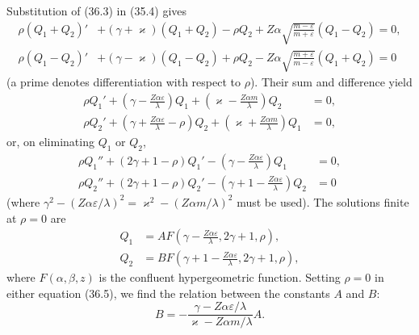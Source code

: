 Substitution of (36.3) in (35.4) gives
\[
\begin{aligned}
\rho(Q_1+Q_2)'&+(\gamma+\varkappa)(Q_1+Q_2)-\rho Q_2
+Z\alpha\sqrt{\frac{m-\varepsilon}{m+\varepsilon}}(Q_1-Q_2)=0,\\
\rho(Q_1-Q_2)'&+(\gamma-\varkappa)(Q_1-Q_2)+\rho Q_2
-Z\alpha\sqrt{\frac{m+\varepsilon}{m-\varepsilon}}(Q_1+Q_2)=0
\end{aligned}
\]
(a prime denotes differentiation with respect to $\rho$). Their sum and difference yield
\begin{equation}
\begin{aligned}
\rho Q_1'+\left(\gamma-\frac{Z\alpha\varepsilon}{\lambda}\right)Q_1
+\left(\varkappa-\frac{Z\alpha m}{\lambda}\right)Q_2&=0,\\
\rho Q_2'+\left(\gamma+\frac{Z\alpha\varepsilon}{\lambda}-\rho\right)Q_2
+\left(\varkappa+\frac{Z\alpha m}{\lambda}\right)Q_1&=0,
\end{aligned}
\tag{36.5}
\end{equation}
or, on eliminating $Q_1$ or $Q_2$,
\[
\begin{aligned}
\rho Q_1''+(2\gamma+1-\rho)Q_1'
-\left(\gamma-\frac{Z\alpha\varepsilon}{\lambda}\right)Q_1&=0,\\
\rho Q_2''+(2\gamma+1-\rho)Q_2'
-\left(\gamma+1-\frac{Z\alpha\varepsilon}{\lambda}\right)Q_2&=0
\end{aligned}
\]
(where $\gamma^2-(Z\alpha\varepsilon/\lambda)^2=\varkappa^2-(Z\alpha m/\lambda)^2$ must be used). The solutions finite at $\rho=0$ are
\begin{equation}
\begin{aligned}
Q_1&=AF\left(\gamma-\frac{Z\alpha\varepsilon}{\lambda},2\gamma+1,\rho\right),\\
Q_2&=BF\left(\gamma+1-\frac{Z\alpha\varepsilon}{\lambda},2\gamma+1,\rho\right),
\end{aligned}
\tag{36.6}
\end{equation}
where $F(\alpha,\beta,z)$ is the confluent hypergeometric function. Setting $\rho=0$ in either equation (36.5), we find the relation between the constants $A$ and $B$:
\begin{equation}
B=-\frac{\gamma-Z\alpha\varepsilon/\lambda}{\varkappa-Z\alpha m/\lambda}A.
\tag{36.7}
\end{equation}


